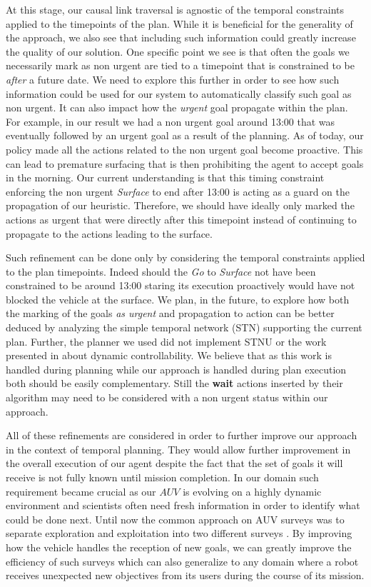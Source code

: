 At this stage, our causal link traversal is agnostic of the temporal 
constraints applied to the timepoints of the plan. While it is
beneficial for the generality of the approach, we also see that
including such information could greatly increase the quality of our solution. 
One specific point we see is that often the goals we necessarily mark
as non urgent are tied to a timepoint that is constrained to be {\em
  after} a future date. We need to explore this further in order to
see how such information could be used for our system to automatically
classify such goal as non urgent. It can also impact how the
{\em urgent} goal propagate within the plan. For example, in our result
we had a non urgent goal around 13:00 that was eventually 
followed by an urgent goal as a result of the planning. As of today, 
our policy made all the actions related to the non urgent goal 
become proactive. This can lead to premature surfacing that is then 
prohibiting the agent to accept goals in the morning. Our current
understanding is that this timing constraint enforcing the non
urgent {\em Surface} to end after 13:00 is acting as a guard on the
propagation of our heuristic. Therefore, we should have ideally only
marked the actions as urgent that were directly after this timepoint
instead of continuing to propagate to the actions leading to the
surface. 

Such refinement can be done only by considering the temporal
constraints applied to the plan timepoints. Indeed should the {\em Go} to
{\em Surface} not have been constrained to be around 13:00 staring
its execution proactively would have not blocked the vehicle at the
surface. We plan, in the future, to explore how both the
marking of the goals {\em as urgent} and propagation to action can be
better deduced by analyzing the simple temporal network (STN)
supporting the current plan. Further, the planner we used did not
implement STNU or the work presented in \cite{morris01} about dynamic
controllability. We believe that as this work is handled during
planning while our approach is handled during plan execution both
should be easily complementary. Still the {\bf wait} actions inserted
by their algorithm may need to be considered with a non
urgent status within our approach. 

All of these refinements are considered in order to further improve
our approach in the context of temporal planning. They would allow
further improvement in the overall execution of our agent despite the fact
that the set of goals it will receive is not fully known until mission 
completion. In our domain such requirement became crucial as our $AUV$
is evolving on a highly dynamic environment and scientists often need
fresh information in order to identify what could be done next. Until
now the common approach on AUV surveys was to separate exploration and
exploitation into two different surveys \cite{Yoerger01012007}. 
By improving how the vehicle handles the reception of
new goals, we can greatly improve the efficiency of such surveys which can
also generalize to any domain where a robot receives unexpected
new objectives from its users during the course of its mission.





